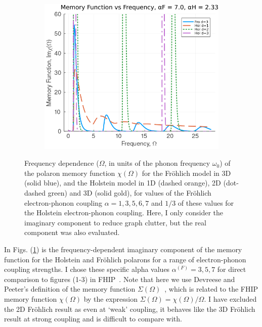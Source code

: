 \begin{figure}
\begin{subfigure}[b]{0.49\textwidth}
  \end{subfigure}
  \begin{subfigure}[b]{0.49\textwidth}
    \centering
    \includegraphics[width=\textwidth]{figures/im_mem_freq_7_233.png}
  \end{subfigure}
  \caption{Frequency dependence ($\Omega$, in units of the phonon frequency $\omega_0$) of the polaron memory function $\chi(\Omega)$ for the Fr\"ohlich model in 3D (solid blue), and the Holstein model in 1D (dashed orange), 2D (dot-dashed green) and 3D (solid gold), for values of the Fr\"ohlich electron-phonon coupling $\alpha = 1, 3, 5,6, 7$ and $1/3$ of these values for the Holstein electron-phonon coupling. Here, I only consider the imaginary component to reduce graph clutter, but the real component was also evaluated.} 
  \label{fig:im_mem_freq}
\end{figure}
In Figs. (\ref{fig:im_mem_freq}) is the frequency-dependent imaginary component of the memory function for the Holstein and Fr\"ohlich polarons for a range of electron-phonon coupling strengths. I chose these specific alpha values $\alpha^{(F)} = 3, 5, 7$ for direct comparison to figures (1-3) in FHIP~\cite{feynman_mobility_1962}. Note that here we use Devreese and Peeter's definition of the memory function $\Sigma(\Omega)$~\cite{peeters_theory_1984}, which is related to the FHIP memory function $\chi(\Omega)$ by the expression $\Sigma(\Omega) = \chi(\Omega) / \Omega$. I have excluded the 2D Fr\"ohlich result as even at `weak' coupling, it behaves like the 3D Fr\"ohlich result at strong coupling and is difficult to compare with.

